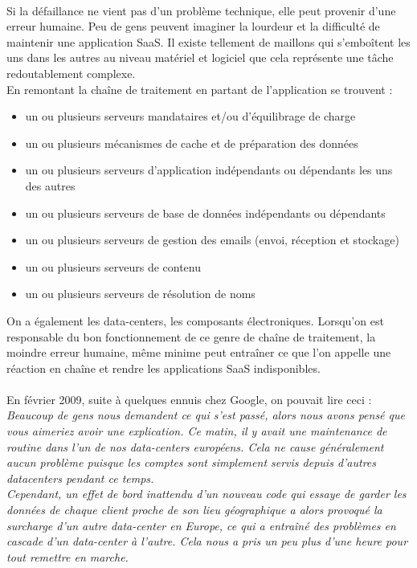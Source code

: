\documentclass[a4paper,12pt]{report}
\begin{document}
\begin{onehalfspace}
	 \paragraph*{}
	 Si la défaillance ne vient pas d'un problème technique, elle peut provenir d'une erreur humaine. Peu de gens peuvent imaginer la lourdeur et la difficulté de maintenir une application SaaS. Il existe
tellement de maillons qui s'emboîtent les uns dans les autres au niveau matériel et logiciel que cela représente une tâche redoutablement complexe.\\
En remontant la chaîne de traitement en partant de l'application se trouvent :
	\begin{itemize}
		\item un ou plusieurs serveurs mandataires et/ou d'équilibrage de charge
		\item un ou plusieurs mécanismes de cache et de préparation des données
		\item un ou plusieurs serveurs d'application indépendants ou dépendants les uns des autres
		\item un ou plusieurs serveurs de base de données indépendants ou dépendants
		\item un ou plusieurs serveurs de gestion des emails (envoi, réception et stockage)
		\item un ou plusieurs serveurs de contenu
		\item un ou plusieurs serveurs de résolution de noms
	\end{itemize}
	On a également les data-centers, les composants électroniques. Lorsqu'on est responsable du bon fonctionnement de ce genre de chaîne de traitement, la moindre erreur humaine, même minime peut entraîner ce que l'on appelle une réaction en chaîne et rendre les applications SaaS indisponibles.
	
	\paragraph*{}
	En février 2009, suite à quelques ennuis chez Google, on pouvait lire ceci : \\
	\textit{Beaucoup de gens nous demandent ce qui s'est passé, alors nous avons pensé que vous aimeriez avoir une explication. Ce matin, il y avait une maintenance de routine dans l'un de nos data-centers européens. Cela ne cause généralement aucun problème puisque les comptes sont simplement servis depuis d'autres datacenters pendant ce temps. \\
Cependant, un effet de bord inattendu d'un nouveau code qui essaye de garder les données de chaque client proche de son lieu géographique a alors provoqué la surcharge d'un autre data-center en Europe, ce qui a entraîné des problèmes en cascade d'un data-center à l'autre. Cela nous a pris un peu plus d'une heure pour tout remettre en marche.}


\end{onehalfspace}
\end{document}
